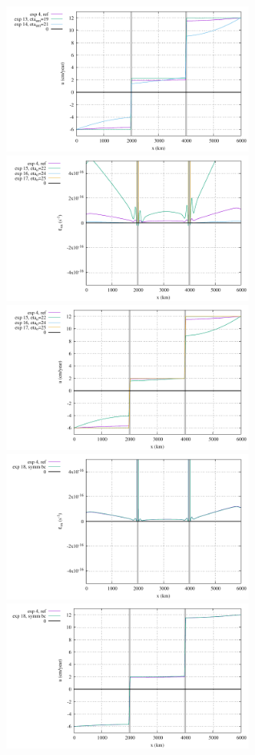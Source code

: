 \begin{center}
\includegraphics[width=8cm]{python_codes/fieldstone_148/results/fig3_u_surface}\\
\includegraphics[width=8cm]{python_codes/fieldstone_148/results/fig4_exx_surface}
\includegraphics[width=8cm]{python_codes/fieldstone_148/results/fig4_u_surface}\\
\includegraphics[width=8cm]{python_codes/fieldstone_148/results/fig5_exx_surface}
\includegraphics[width=8cm]{python_codes/fieldstone_148/results/fig5_u_surface}\\
\end{center}



